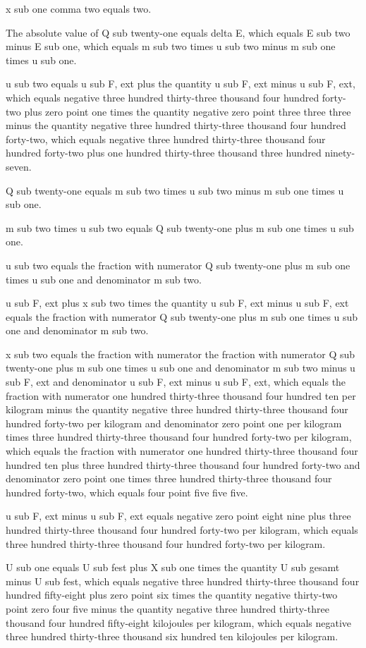 x sub one comma two equals two.

The absolute value of Q sub twenty-one equals delta E, which equals E sub two minus E sub one, which equals m sub two times u sub two minus m sub one times u sub one.

u sub two equals u sub F, ext plus the quantity u sub F, ext minus u sub F, ext, which equals negative three hundred thirty-three thousand four hundred forty-two plus zero point one times the quantity negative zero point three three three minus the quantity negative three hundred thirty-three thousand four hundred forty-two, which equals negative three hundred thirty-three thousand four hundred forty-two plus one hundred thirty-three thousand three hundred ninety-seven.

Q sub twenty-one equals m sub two times u sub two minus m sub one times u sub one.

m sub two times u sub two equals Q sub twenty-one plus m sub one times u sub one.

u sub two equals the fraction with numerator Q sub twenty-one plus m sub one times u sub one and denominator m sub two.

u sub F, ext plus x sub two times the quantity u sub F, ext minus u sub F, ext equals the fraction with numerator Q sub twenty-one plus m sub one times u sub one and denominator m sub two.

x sub two equals the fraction with numerator the fraction with numerator Q sub twenty-one plus m sub one times u sub one and denominator m sub two minus u sub F, ext and denominator u sub F, ext minus u sub F, ext, which equals the fraction with numerator one hundred thirty-three thousand four hundred ten per kilogram minus the quantity negative three hundred thirty-three thousand four hundred forty-two per kilogram and denominator zero point one per kilogram times three hundred thirty-three thousand four hundred forty-two per kilogram, which equals the fraction with numerator one hundred thirty-three thousand four hundred ten plus three hundred thirty-three thousand four hundred forty-two and denominator zero point one times three hundred thirty-three thousand four hundred forty-two, which equals four point five five five.

u sub F, ext minus u sub F, ext equals negative zero point eight nine plus three hundred thirty-three thousand four hundred forty-two per kilogram, which equals three hundred thirty-three thousand four hundred forty-two per kilogram.

U sub one equals U sub fest plus X sub one times the quantity U sub gesamt minus U sub fest, which equals negative three hundred thirty-three thousand four hundred fifty-eight plus zero point six times the quantity negative thirty-two point zero four five minus the quantity negative three hundred thirty-three thousand four hundred fifty-eight kilojoules per kilogram, which equals negative three hundred thirty-three thousand six hundred ten kilojoules per kilogram.